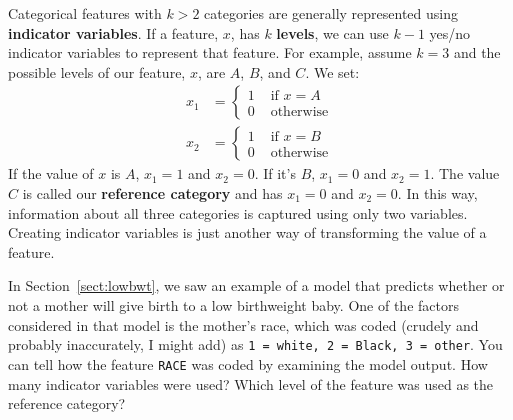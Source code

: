 Categorical features with $k>2$ categories are generally represented using \textbf{indicator variables}. If a feature, $x$, has $k$ \textbf{levels}, we can use $k-1$ yes/no indicator variables to represent that feature. For example, assume $k = 3$ and the possible levels of our feature, $x$, are $A$, $B$, and $C$. We set:
\begin{align*} 
x_1 &= \left\{ \begin{array}{cl} 1 & \text{ if }x = A \\
                                                0 & \text{ otherwise} \end{array} \right. \\[2mm]
x_2 &= \left\{ \begin{array}{cl} 1 & \text{ if }x = B \\
                                                0 & \text{ otherwise} \end{array} \right.
\end{align*}
If the value of $x$ is $A$, $x_1 = 1$ and $x_2 = 0$. If it's $B$, $x_1 = 0$ and $x_2 = 1$. The value $C$ is called our \textbf{reference category} and has $x_1 = 0$ and $x_2 = 0$. In this way, information about all three categories is captured using only two variables. Creating indicator variables is just another way of transforming the value of a feature.
\vspace{4mm}

\begin{question}{}
In Section~\ref{sect:lowbwt}, we saw an example of a model that predicts whether or not a mother will give birth to a low birthweight baby. One of the factors considered in that model is the mother's race, which was coded (crudely and probably inaccurately, I might add) as \texttt{1 = white, 2 = Black, 3 = other}. You can tell how the feature \texttt{RACE} was coded by examining the model output. How many indicator variables were used? Which level of the feature was used as the reference category?
\end{question}



